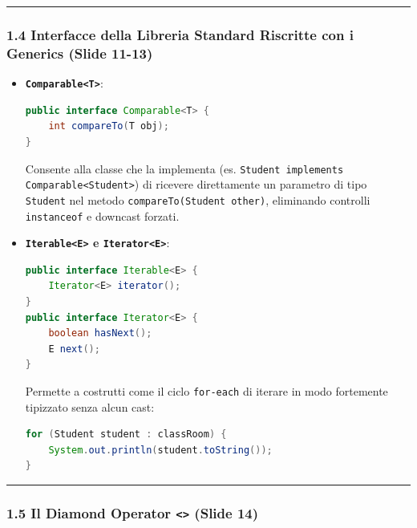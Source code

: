 \documentclass[11pt,a4paper]{article}
\newcommand{\passthrough}[1]{#1}
\begin{document}
\begin{center}\rule{0.5\linewidth}{0.5pt}\end{center}

\subsubsection{1.4 Interfacce della Libreria Standard Riscritte con i
Generics (Slide
11-13)}\label{interfacce-della-libreria-standard-riscritte-con-i-generics-slide-11-13}

\begin{itemize}
\item
  \textbf{\passthrough{\lstinline!Comparable<T>!}}:

\begin{lstlisting}[language=Java]
public interface Comparable<T> {
    int compareTo(T obj);
}
\end{lstlisting}

  Consente alla classe che la implementa (es.
  \passthrough{\lstinline!Student implements Comparable<Student>!}) di
  ricevere direttamente un parametro di tipo
  \passthrough{\lstinline!Student!} nel metodo
  \passthrough{\lstinline!compareTo(Student other)!}, eliminando
  controlli \passthrough{\lstinline!instanceof!} e downcast forzati.
\item
  \textbf{\passthrough{\lstinline!Iterable<E>!} e
  \passthrough{\lstinline!Iterator<E>!}}:

\begin{lstlisting}[language=Java]
public interface Iterable<E> {
    Iterator<E> iterator();
}
public interface Iterator<E> {
    boolean hasNext();
    E next();
}
\end{lstlisting}

  Permette a costrutti come il ciclo \passthrough{\lstinline!for-each!}
  di iterare in modo fortemente tipizzato senza alcun cast:

\begin{lstlisting}[language=Java]
for (Student student : classRoom) {
    System.out.println(student.toString());
}
\end{lstlisting}
\end{itemize}

\begin{center}\rule{0.5\linewidth}{0.5pt}\end{center}

\subsubsection{\texorpdfstring{1.5 Il Diamond Operator
\texttt{\textless{}\textgreater{}} (Slide
14)}{1.5 Il Diamond Operator \textless\textgreater{} (Slide 14)}}\label{il-diamond-operator-slide-14}
\end{document}
